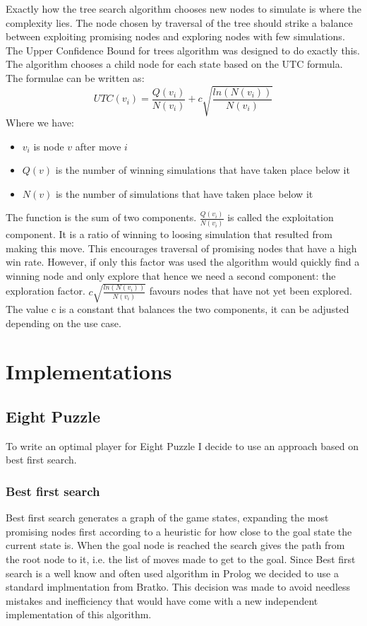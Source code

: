 \documentclass[a4paper,12pt]{report}
\begin{document}
Exactly how the tree search algorithm chooses new nodes to simulate is where the complexity lies. The node chosen by traversal of the tree should strike a balance between exploiting promising nodes and exploring nodes with few simulations. The Upper Confidence Bound for trees algorithm was designed to do exactly this\cite{Kocsis/UCT}. The algorithm chooses a child node for each state based on the UTC formula. The formulae can be written as: \[UTC(v_i) = \frac{Q(v_i)}{N(v_i)} + c\sqrt{\frac{ln(N(v_i))}{N(v_i)}}\] Where we have:
\begin{itemize}
\item $v_i$ is node $v$ after move $i$
\item $Q(v)$ is the number of winning simulations that have taken place below it
\item $N(v)$ is the number of simulations that have taken place below it
\end{itemize}
The function is the sum of two components. $\frac{Q(v_i)}{N(v_i)}$ is called the exploitation component. It is a ratio of winning to loosing simulation that resulted from making this move. This encourages traversal of promising nodes that have a high win rate. However, if only this factor was used the algorithm would quickly find a winning node and only explore that hence we need a second component: the exploration factor. $c\sqrt{\frac{ln(N(v_i))}{N(v_i)}}$ favours nodes that have not yet been explored. The value c is a constant that balances the two components, it can be adjusted depending on the use case.



\chapter{Implementations}
\section{Eight Puzzle}
To write an optimal player for Eight Puzzle I decide to use an approach based on best first search.
\subsection{Best first search}
Best first search generates a graph of the game states, expanding the most promising nodes first according to a heuristic for how close to the goal state the current state is. When the goal node is reached the search gives the path from the root node to it, i.e. the list of moves made to get to the goal.
Since Best first search is a well know and often used algorithm in Prolog we decided to use a standard implmentation from Bratko\cite{Bratko}. This decision was made to avoid needless mistakes and inefficiency that would have come with a new independent implementation of this algorithm.
\end{document}

